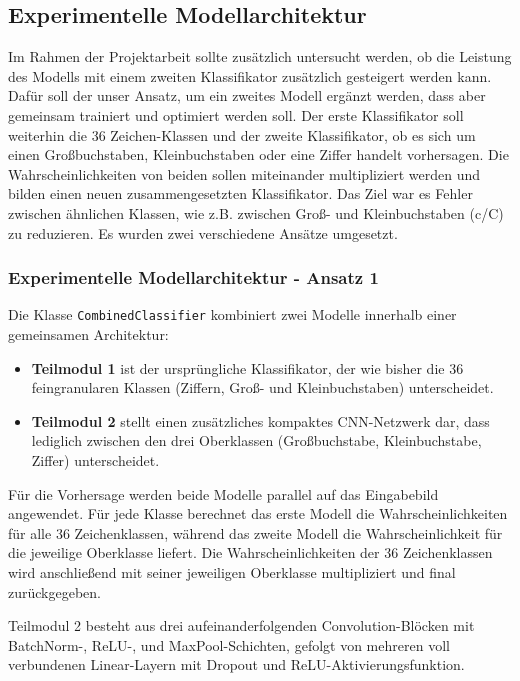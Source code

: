 \documentclass[12pt,oneside]{article}
\begin{document}
	
	\subsection{Experimentelle Modellarchitektur}
		Im Rahmen der Projektarbeit sollte zusätzlich untersucht werden, ob die Leistung des Modells mit einem zweiten Klassifikator zusätzlich gesteigert werden kann. Dafür soll der unser Ansatz, um ein zweites Modell ergänzt werden, dass aber gemeinsam trainiert und optimiert werden soll. Der erste Klassifikator soll weiterhin die 36 Zeichen-Klassen und der zweite Klassifikator, ob es sich um einen Großbuchstaben, Kleinbuchstaben oder eine Ziffer handelt vorhersagen. Die Wahrscheinlichkeiten von beiden sollen miteinander multipliziert werden und bilden einen neuen zusammengesetzten Klassifikator. Das Ziel war es Fehler zwischen ähnlichen Klassen, wie z.B. zwischen Groß- und Kleinbuchstaben (c/C) zu reduzieren.
		Es wurden zwei verschiedene Ansätze umgesetzt.
	
		\subsubsection{Experimentelle Modellarchitektur - Ansatz 1}
			Die Klasse \texttt{CombinedClassifier} kombiniert zwei Modelle innerhalb einer gemeinsamen Architektur: 
			\begin{itemize}
				\item \textbf{Teilmodul 1} 
					ist der ursprüngliche Klassifikator, der wie bisher die 36 feingranularen Klassen (Ziffern, Groß- und Kleinbuchstaben) unterscheidet. 
				\item \textbf{Teilmodul 2}
					stellt einen zusätzliches kompaktes CNN-Netzwerk dar, dass lediglich zwischen den drei Oberklassen (Großbuchstabe, Kleinbuchstabe, Ziffer) unterscheidet.
			\end{itemize}

			Für die Vorhersage werden beide Modelle parallel auf das Eingabebild angewendet. Für jede Klasse berechnet das erste Modell die Wahrscheinlichkeiten für alle 36 Zeichenklassen, während das zweite Modell die Wahrscheinlichkeit für die jeweilige Oberklasse liefert. Die Wahrscheinlichkeiten der 36 Zeichenklassen wird anschließend mit seiner jeweiligen Oberklasse multipliziert und final zurückgegeben.
			
			Teilmodul 2 besteht aus drei aufeinanderfolgenden Convolution-Blöcken mit Batch\-Norm-, ReLU{-}, und Max\-Pool-Schichten, gefolgt von mehreren voll verbundenen Linear-Layern mit Dropout und ReLU-Aktivierungsfunktion.
\end{document}
